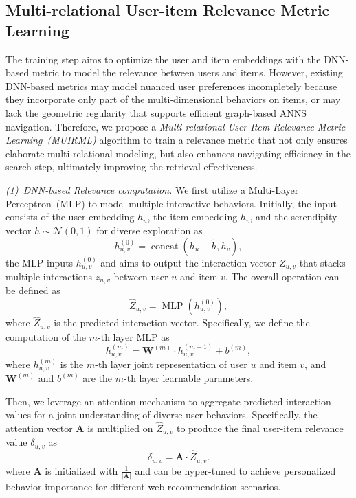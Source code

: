 \subsection{Multi-relational User-item Relevance Metric Learning}\label{gmpgr:sec:metric}

The training step aims to optimize the user and item embeddings with the DNN-based metric to model the relevance between users and items.
However, existing DNN-based metrics may model nuanced user preferences incompletely because they incorporate only part of the multi-dimensional behaviors on items, or may lack the geometric regularity that supports efficient graph-based ANNS navigation.
Therefore, we propose a \textit{Multi-relational User-Item Relevance Metric Learning~(MUIRML)} algorithm to train a relevance metric that not only ensures elaborate multi-relational modeling, but also enhances navigating efficiency in the search step, ultimately improving the retrieval effectiveness.

\textit{(1)~DNN-based Relevance computation.}
We first utilize a Multi-Layer Perceptron~(MLP) to model multiple interactive behaviors.
Initially, the input consists of the user embedding $h_u$, the item embedding $h_v$, and the serendipity vector $\tilde{h} \sim \mathcal{N}(0,1)$ for diverse exploration as
\begin{equation}
    h_{u,v}^{(0)} = \operatorname{concat}(h_u+\tilde{h},h_v),
\end{equation}
the MLP inputs $h_{u,v}^{(0)}$ and aims to output the interaction vector $Z_{u,v}$ that stacks multiple interactions $z_{u,v}$ between user $u$ and item $v$.
The overall operation can be defined as
\begin{equation}
    \hat{Z}_{u,v} = \operatorname{MLP}(h_{u,v}^{(0)}),
\end{equation}
where $\hat{Z}_{u,v}$ is the predicted interaction vector.
Specifically, we define the computation of the $m$-th layer MLP as
\begin{equation}
    h_{u,v}^{(m)} = \mathbf{W}^{(m)} \cdot h_{u,v}^{(m-1)}+b^{(m)},
\end{equation}
where $h_{u,v}^{(m)}$ is the $m$-th layer joint representation of user $u$ and item $v$, and $\mathbf{W}^{(m)}$ and $b^{(m)}$ are the $m$-th layer learnable parameters.

Then, we leverage an attention mechanism to aggregate predicted interaction values for a joint understanding of diverse user behaviors.
Specifically, the attention vector $\mathbf{A}$ is multiplied on $\hat{Z}_{u,v}$ to produce the final user-item relevance value $\delta_{u,v}$ as
\begin{equation*}
\delta_{u,v} = \mathbf{A} \cdot \hat{Z}_{u,v}.
\end{equation*}
where $\mathbf{A}$ is initialized with $\frac{1}{|\mathbf{A}|}$ and can be hyper-tuned to achieve personalized behavior importance for different web recommendation scenarios.


